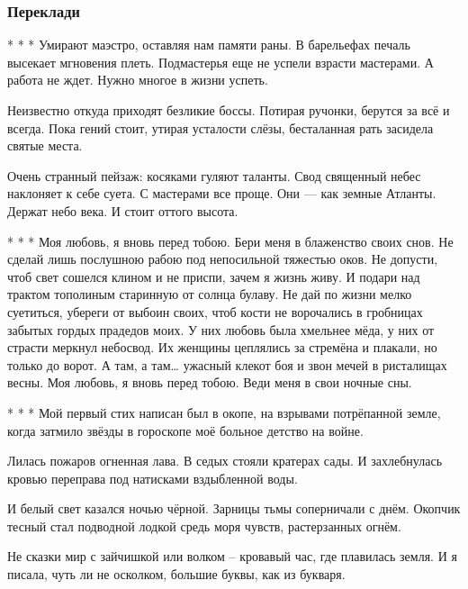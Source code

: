  
 
 

\subsubsection{Переклади}
\label{sec:poetry.rus.lina_kostenko.translations}


* * *
Умирают маэстро, оставляя нам памяти раны.
В барельефах печаль высекает мгновения плеть.
Подмастерья еще не успели взрасти мастерами.
А работа не ждет. Нужно многое в жизни успеть.
 
Неизвестно откуда приходят безликие боссы.
Потирая ручонки, берутся за всё и всегда.
Пока гений стоит, утирая усталости слёзы,
бесталанная рать засидела святые места.

Очень странный пейзаж: косяками гуляют таланты.
Свод священный небес наклоняет к себе суета.
С мастерами все проще. Они --- как земные Атланты.
Держат небо века. И стоит оттого высота.

* * *
Моя любовь, я вновь перед тобою.
Бери меня в блаженство своих снов.
Не сделай лишь послушною рабою
под непосильной тяжестью оков.
Не допусти, чтоб свет сошелся клином
и не приспи, зачем я жизнь живу.
И подари над трактом тополиным
старинную от солнца булаву.
Не дай по жизни мелко суетиться,
убереги от выбоин своих,
чтоб кости не ворочались в гробницах
забытых гордых прадедов моих.
У них любовь была хмельнее мёда,
у них от страсти меркнул  небосвод.
Их женщины цеплялись за стремёна
и плакали, но только до ворот.
А там, а там… ужасный клекот боя
и звон мечей в ристалищах весны. 
Моя любовь, я вновь перед тобою.
Веди меня в свои ночные сны.

* * *
Мой первый стих написан был в окопе,
на взрывами потрёпанной земле,
когда затмило звёзды в гороскопе
моё больное детство на войне.

Лилась пожаров огненная лава.
В седых стояли кратерах сады.
И захлебнулась кровью переправа
под натисками вздыбленной воды.

И белый свет казался ночью чёрной.
Зарницы тьмы соперничали с днём.
Окопчик тесный стал подводной лодкой
средь моря чувств, растерзанных огнём.

Не сказки  мир с зайчишкой или волком –
кровавый час, где плавилась земля.
И я писала, чуть ли не осколком,
большие буквы, как из букваря.

